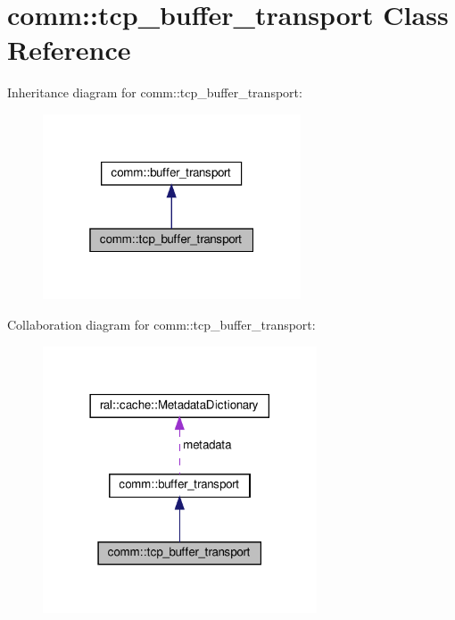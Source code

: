 \hypertarget{classcomm_1_1tcp__buffer__transport}{}\section{comm\+:\+:tcp\+\_\+buffer\+\_\+transport Class Reference}
\label{classcomm_1_1tcp__buffer__transport}


Inheritance diagram for comm\+:\+:tcp\+\_\+buffer\+\_\+transport\+:\nopagebreak
\begin{figure}[H]
\begin{center}
\leavevmode
\includegraphics[width=217pt]{classcomm_1_1tcp__buffer__transport__inherit__graph}
\end{center}
\end{figure}


Collaboration diagram for comm\+:\+:tcp\+\_\+buffer\+\_\+transport\+:\nopagebreak
\begin{figure}[H]
\begin{center}
\leavevmode
\includegraphics[width=230pt]{classcomm_1_1tcp__buffer__transport__coll__graph}
\end{center}
\end{figure}
